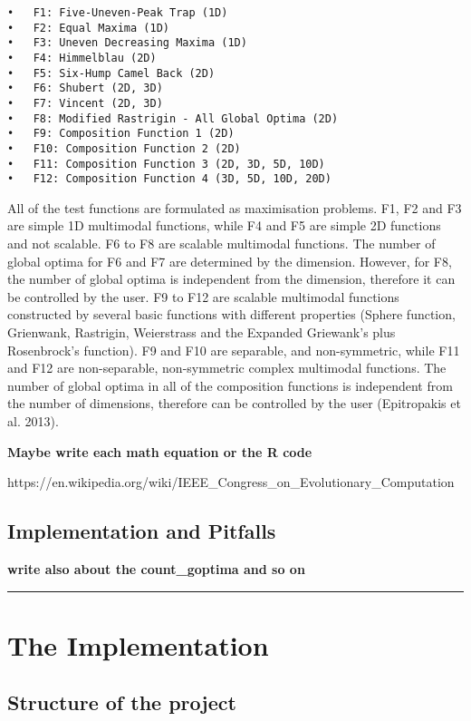 \documentclass[12pt,a4paper]{article}
\begin{document}
\begin{verbatim}
•   F1: Five-Uneven-Peak Trap (1D)
•   F2: Equal Maxima (1D)
•   F3: Uneven Decreasing Maxima (1D)
•   F4: Himmelblau (2D)
•   F5: Six-Hump Camel Back (2D)
•   F6: Shubert (2D, 3D)
•   F7: Vincent (2D, 3D)
•   F8: Modified Rastrigin - All Global Optima (2D)
•   F9: Composition Function 1 (2D)
•   F10: Composition Function 2 (2D)
•   F11: Composition Function 3 (2D, 3D, 5D, 10D)
•   F12: Composition Function 4 (3D, 5D, 10D, 20D)
\end{verbatim}

All of the test functions are formulated as maximisation problems. F1,
F2 and F3 are simple 1D multimodal functions, while F4 and F5 are simple
2D functions and not scalable. F6 to F8 are scalable multimodal
functions. The number of global optima for F6 and F7 are determined by
the dimension. However, for F8, the number of global optima is
independent from the dimension, therefore it can be controlled by the
user. F9 to F12 are scalable multimodal functions constructed by several
basic functions with different properties (Sphere function, Grienwank,
Rastrigin, Weierstrass and the Expanded Griewank's plus Rosenbrock's
function). F9 and F10 are separable, and non-symmetric, while F11 and
F12 are non-separable, non-symmetric complex multimodal functions. The
number of global optima in all of the composition functions is
independent from the number of dimensions, therefore can be controlled
by the user (Epitropakis et al. 2013).

\textbf{Maybe write each math equation or the R code}

https://en.wikipedia.org/wiki/IEEE\_Congress\_on\_Evolutionary\_Computation

\subsection{Implementation and
Pitfalls}\label{implementation-and-pitfalls}

\textbf{write also about the count\_goptima and so on}

\begin{center}\rule{0.5\linewidth}{\linethickness}\end{center}

\section{The Implementation}\label{the-implementation}

\subsection{Structure of the project}\label{structure-of-the-project}
\end{document}
